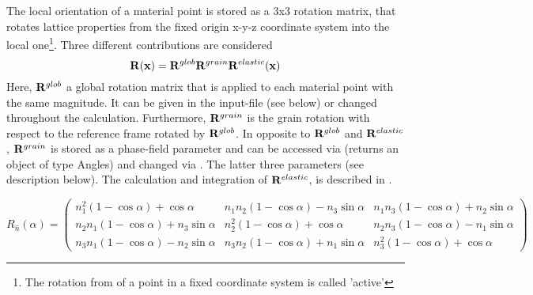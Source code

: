 The local orientation of a material point is stored as a 3x3 rotation matrix, that rotates lattice properties from the fixed origin x-y-z coordinate system into the local one\footnote{The rotation from of a point in a fixed coordinate system is called 'active'}. Three different contributions are considered
\begin{equation*}
\mathbf{R}(\mathbf{x}) = \mathbf{R}^{glob}\mathbf{R}^{grain}\mathbf{R}^{elastic}(\mathbf{x})
\end{equation*}
Here, $\mathbf{R}^{glob}$ a global rotation matrix that is applied to each material point with the same magnitude. It can be given in the input-file (see below) or changed throughout the calculation. Furthermore, $\mathbf{R}^{grain}$ is the grain rotation with respect to the reference frame rotated by $\mathbf{R}^{glob}$. In opposite to $\mathbf{R}^{glob}$ and $\mathbf{R}^{elastic}$, $\mathbf{R}^{grain}$ is stored as a phase-field parameter and can be accessed via  (returns an object of type Angles) and changed via . The latter three parameters (see description below). The calculation and integration of $\mathbf{R}^{elastic}$, is described in .

\begin{equation*}
R_{\hat n}(\alpha) = \begin{pmatrix}
n_1^2 \left(1-\cos\alpha\right) + \cos\alpha  & n_1 n_2 \left(1-\cos\alpha\right) - n_3 \sin\alpha &  n_1 n_3 \left(1-\cos\alpha\right) + n_2 \sin\alpha \\
n_2 n_1 \left(1-\cos\alpha\right) + n_3 \sin\alpha  & n_2^2\left(1-\cos\alpha\right) + \cos\alpha &   n_2 n_3 \left(1-\cos\alpha\right) - n_1 \sin\alpha \\
n_3 n_1 \left(1-\cos\alpha\right) - n_2 \sin\alpha &  n_3 n_2 \left(1-\cos\alpha\right) + n_1 \sin\alpha & n_3^2\left(1-\cos\alpha\right) + \cos\alpha
\end{pmatrix}
\end{equation*}
 
